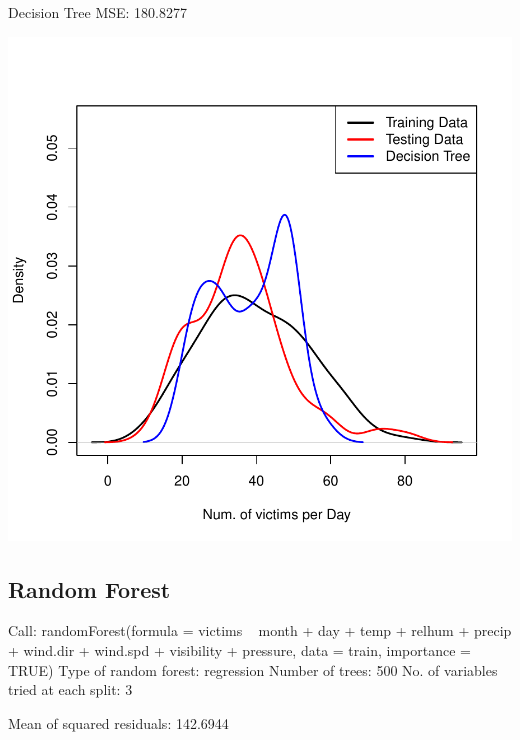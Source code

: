 \documentclass[11pt, a4paper]{article}
\begin{document}
\begin{Schunk}
\begin{Soutput}
Decision Tree MSE: 180.8277
\end{Soutput}
\end{Schunk}
\includegraphics{regression-038}





\pagebreak
\subsection{Random Forest}

\begin{Schunk}
\begin{Soutput}
Call:
 randomForest(formula = victims ~ month + day + temp + relhum +      precip + wind.dir + wind.spd + visibility + pressure, data = train,      importance = TRUE) 
               Type of random forest: regression
                     Number of trees: 500
No. of variables tried at each split: 3

          Mean of squared residuals: 142.6944
\end{Soutput}
\end{Schunk}
\end{document}
